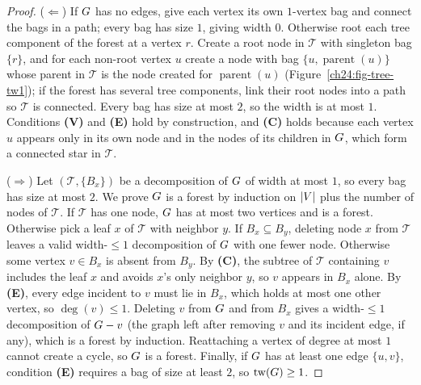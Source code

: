 \begin{proof}
($\Leftarrow$) If $G$ has no edges, give each vertex its own $1$-vertex bag and connect the bags in a path; every bag has size $1$, giving width $0$. Otherwise root each tree component of the forest at a vertex $r$. Create a root node in $\mathcal{T}$ with singleton bag $\{r\}$, and for each non-root vertex $u$ create a node with bag $\{u,\operatorname{parent}(u)\}$ whose parent in $\mathcal{T}$ is the node created for $\operatorname{parent}(u)$ (Figure~\ref{ch24:fig-tree-tw1}); if the forest has several tree components, link their root nodes into a path so $\mathcal{T}$ is connected. Every bag has size at most $2$, so the width is at most $1$. Conditions \textbf{(V)} and \textbf{(E)} hold by construction, and \textbf{(C)} holds because each vertex $u$ appears only in its own node and in the nodes of its children in $G$, which form a connected star in $\mathcal{T}$.

($\Rightarrow$) Let $(\mathcal{T},\{B_x\})$ be a decomposition of $G$ of width at most $1$, so every bag has size at most $2$. We prove $G$ is a forest by induction on $\lvert V\rvert$ plus the number of nodes of $\mathcal{T}$. If $\mathcal{T}$ has one node, $G$ has at most two vertices and is a forest. Otherwise pick a leaf $x$ of $\mathcal{T}$ with neighbor $y$. If $B_x\subseteq B_y$, deleting node $x$ from $\mathcal{T}$ leaves a valid width-$\le 1$ decomposition of $G$ with one fewer node. Otherwise some vertex $v\in B_x$ is absent from $B_y$. By \textbf{(C)}, the subtree of $\mathcal{T}$ containing $v$ includes the leaf $x$ and avoids $x$'s only neighbor $y$, so $v$ appears in $B_x$ alone. By \textbf{(E)}, every edge incident to $v$ must lie in $B_x$, which holds at most one other vertex, so $\deg(v)\le 1$. Deleting $v$ from $G$ and from $B_x$ gives a width-$\le 1$ decomposition of $G-v$ (the graph left after removing $v$ and its incident edge, if any), which is a forest by induction. Reattaching a vertex of degree at most $1$ cannot create a cycle, so $G$ is a forest. Finally, if $G$ has at least one edge $\{u,v\}$, condition \textbf{(E)} requires a bag of size at least $2$, so $\operatorname{tw}(G)\ge 1$.
\end{proof}

